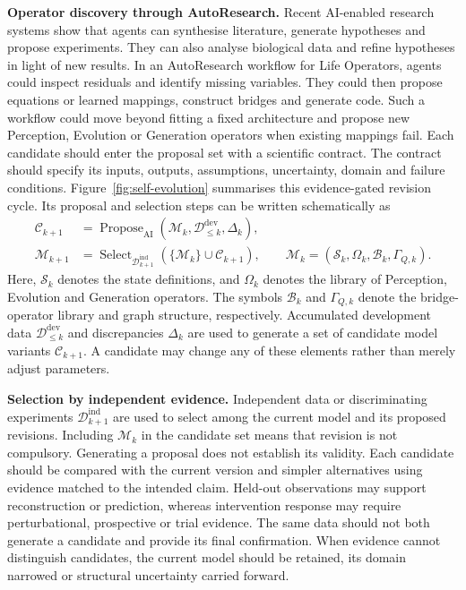 \documentclass[12pt, letterpaper]{article} %
\begin{document}
\textbf{Operator discovery through AutoResearch.} Recent AI-enabled research systems show that agents can synthesise literature, generate hypotheses and propose experiments. They can also analyse biological data and refine hypotheses in light of new results\cite{Gottweis2026CoScientist,Ghareeb2026Robin}. In an AutoResearch workflow for Life Operators, agents could inspect residuals and identify missing variables. They could then propose equations or learned mappings, construct bridges and generate code. Such a workflow could move beyond fitting a fixed architecture and propose new Perception, Evolution or Generation operators when existing mappings fail. Each candidate should enter the proposal set with a scientific contract. The contract should specify its inputs, outputs, assumptions, uncertainty, domain and failure conditions. Figure~\ref{fig:self-evolution} summarises this evidence-gated revision cycle. Its proposal and selection steps can be written schematically as
\begin{equation}
\begin{aligned}
\mathcal C_{k+1}
&=
\operatorname{Propose}_{\mathrm{AI}}
\!\left(\mathcal M_k,\mathcal D_{\leq k}^{\mathrm{dev}},\Delta_k\right),\\
\mathcal M_{k+1}
&=
\operatorname{Select}_{\mathcal D_{k+1}^{\mathrm{ind}}}
\!\left(\{\mathcal M_k\}\cup\mathcal C_{k+1}\right),
\qquad
\mathcal M_k=(\mathcal S_k,\Omega_k,\mathcal B_k,\Gamma_{Q,k}).
\end{aligned}
\label{eq:self-evolution}
\end{equation}
Here, $\mathcal S_k$ denotes the state definitions, and $\Omega_k$ denotes the library of Perception, Evolution and Generation operators. The symbols $\mathcal B_k$ and $\Gamma_{Q,k}$ denote the bridge-operator library and graph structure, respectively. Accumulated development data $\mathcal D_{\leq k}^{\mathrm{dev}}$ and discrepancies $\Delta_k$ are used to generate a set of candidate model variants $\mathcal C_{k+1}$. A candidate may change any of these elements rather than merely adjust parameters.

\textbf{Selection by independent evidence.} Independent data or discriminating experiments $\mathcal D_{k+1}^{\mathrm{ind}}$ are used to select among the current model and its proposed revisions. Including $\mathcal M_k$ in the candidate set means that revision is not compulsory. Generating a proposal does not establish its validity. Each candidate should be compared with the current version and simpler alternatives using evidence matched to the intended claim. Held-out observations may support reconstruction or prediction, whereas intervention response may require perturbational, prospective or trial evidence. The same data should not both generate a candidate and provide its final confirmation. When evidence cannot distinguish candidates, the current model should be retained, its domain narrowed or structural uncertainty carried forward.
\end{document}
